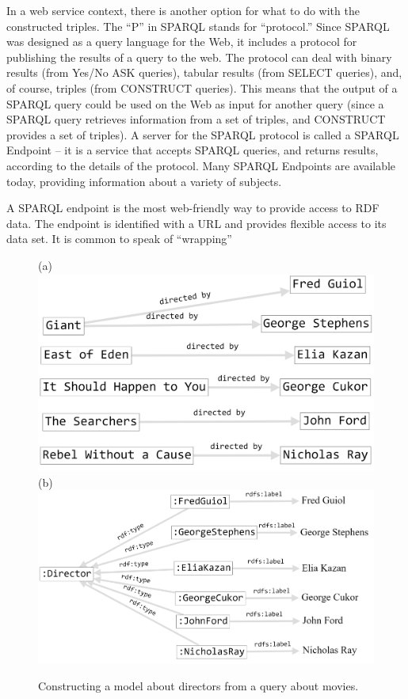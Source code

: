 In a web service context, there is another option for what to do with
the constructed triples. The ``P'' in SPARQL stands for ``protocol.''
Since SPARQL was designed as a query language for the Web, it includes a
protocol for publishing the results of a query to the web. The protocol
can deal with binary results (from Yes/No ASK queries), tabular results
(from SELECT queries), and, of course, triples (from CONSTRUCT queries).
This means that the output of a SPARQL query could be used on the Web as
input for another query (since a SPARQL query retrieves information from
a set of triples, and CONSTRUCT provides a set of triples). A server for
the SPARQL protocol is called a SPARQL Endpoint -- it is a service that
accepts SPARQL queries, and returns results, according to the details of
the protocol. Many SPARQL Endpoints are available today, providing
information about a variety of subjects. 


A SPARQL endpoint is the most web-friendly way to provide access to RDF
data. The endpoint is identified with a URL and provides flexible access
to its data set. It is common to speak of ``wrapping''

\begin{figure}
\centering
(a)
\includegraphics[width=5in]{SWWOv3/media/ch6/figure6-8a.png}
(b)
\includegraphics[width=5in]{SWWOv3/media/ch6/figure6-8b.png}
\label{fig:ch6.8}
\caption{Constructing a model about directors from a query about movies.}
\end{figure}

